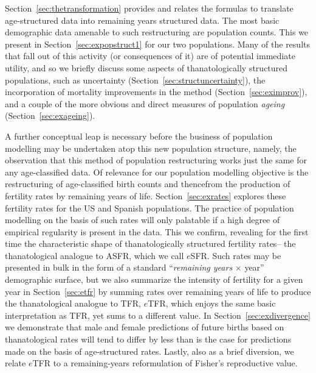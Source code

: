 Section~\ref{sec:thetransformation} provides and relates the formulas to
translate age-structured data into remaining years structured data. The most
basic demographic data amenable to such restructuring are population counts.
This we present in Section~\ref{sec:expopstruct1} for our two populations.
Many of the results that fall out of this activity (or consequences of it) are
of potential immediate utility, and so we briefly discuss some aspects of
thanatologically structured populations, such as uncertainty
(Section~\ref{sec:structuncertainty}), the incorporation of mortality
improvements in the method (Section~\ref{sec:eximprov}), and a couple of
the more obvious and direct measures of population \textit{ageing}
(Section~\ref{sec:exageing}).

A further conceptual leap is necessary before the business of population
modelling may be undertaken atop this new population structure, namely, the
observation that this method of population restructuring works just the same for any age-classified data. Of
relevance for our population modelling objective is the restructuring of
age-classified birth counts and thencefrom the production of fertility rates by
remaining years of life. Section~\ref{sec:exrates} explores these fertility
rates for the US and Spanish populations. The practice of population modelling
on the basis of such rates will only palatable if a high degree of empirical
regularity is present in the data. This we confirm, revealing for the first
time the characteristic shape of thanatologically structured fertility rates--
the thanatological analogue to ASFR, which we call $e$SFR. Such rates may be
presented in bulk in the form of a standard ``\textit{remaining years} $\times$
year'' demographic surface, but we also summarize the intensity of fertility
for a given year in Section~\ref{sec:etfr} by summing rates over remaining years of life to produce
the thanatological analogue to TFR, $e$TFR, which enjoys the
same basic interpretation as TFR, yet sums to a different value. In
Section~\ref{sec:exdivergence} we demonstrate that male and female predictions
of future births based on thanatological rates will tend to differ by less than 
is the case for predictions made on the basis of age-structured rates. Lastly,
also as a brief diversion, we relate $e$TFR to a remaining-years reformulation
of Fisher's reproductive value.


